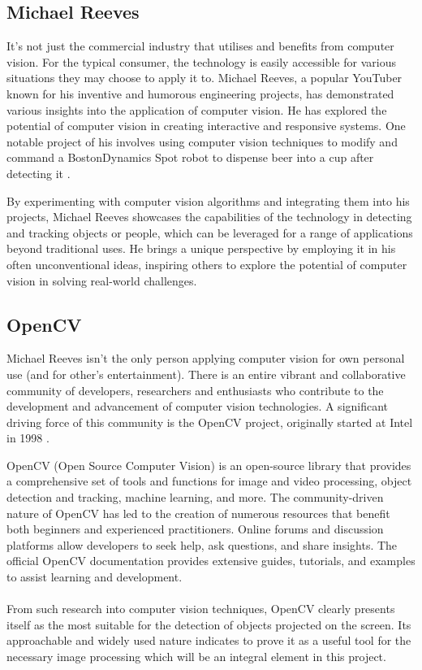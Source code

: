 \documentclass[final]{cmpreport_02}
\begin{document}
\subsection{Michael Reeves}

It's not just the commercial industry that utilises and benefits from computer vision. For the typical consumer, the technology is easily accessible for various situations they may choose to apply it to.
Michael Reeves, a popular YouTuber known for his inventive and humorous engineering projects, has demonstrated various insights into the application of computer vision. He has explored the potential of computer vision in creating interactive and responsive systems. One notable project of his involves using computer vision techniques to modify and command a BostonDynamics Spot\textregistered{} robot to dispense beer into a cup after detecting it \citep{MichaelReeves}.

By experimenting with computer vision algorithms and integrating them into his projects, Michael Reeves showcases the capabilities of the technology in detecting and tracking objects or people, which can be leveraged for a range of applications beyond traditional uses. He brings a unique perspective by employing it in his often unconventional ideas, inspiring others to explore the potential of computer vision in solving real-world challenges.

\subsection{OpenCV}

Michael Reeves isn't the only person applying computer vision for own personal use (and for other's entertainment). There is an entire vibrant and collaborative community of developers, researchers and enthusiasts who contribute to the development and advancement of computer vision technologies. A significant driving force of this community is the OpenCV project, originally started at Intel in 1998 \citep{OpenCV:Intel}.

OpenCV (Open Source Computer Vision) is an open-source library that provides a comprehensive set of tools and functions for image and video processing, object detection and tracking, machine learning, and more. The community-driven nature of OpenCV has led to the creation of numerous resources that benefit both beginners and experienced practitioners. Online forums and discussion platforms allow developers to seek help, ask questions, and share insights. The official OpenCV documentation provides extensive guides, tutorials, and examples to assist learning and development.
\\\\
From such research into computer vision techniques, OpenCV clearly presents itself as the most suitable for the detection of  objects projected on the screen. Its approachable and widely used nature indicates to prove it as a useful tool for the necessary image processing which will be an integral element in this project.
\end{document}
